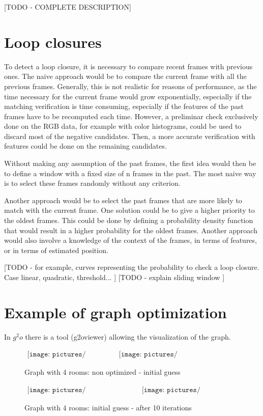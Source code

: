 [TODO - COMPLETE DESCRIPTION]

\section{Loop closures}

To detect a loop closure, it is necessary to compare recent frames with previous ones. The naive approach would be to compare the current frame with all the previous frames. Generally, this is not realistic for reasons of performance, as the time necessary for the current frame would grow exponentially, especially if the matching verification is time consuming, especially if the features of the past frames have to be recomputed each time. However, a preliminar check exclusively done on the RGB data, for example with color histograms, could be used to discard most of the negative candidates. Then, a more accurate verification with features could be done on the remaining candidates.

Without making any assumption of the past frames, the first idea would then be to define a window with a fixed size of n frames in the past. The most naive way is to select these frames randomly without any criterion.

Another approach would be to select the past frames that are more likely to match with the current frame. One solution could be to give a higher priority to the oldest frames. This could be done by defining a probability density function that would result in a higher probability for the oldest frames. Another approach would also involve a knowledge of the context of the frames, in terms of features, or in terms of estimated position.

[TODO - for example, curves representing the probability to check a loop closure. Case linear, quadratic, threshold... ]
[TODO - explain sliding window ]

\section{Example of graph optimization}
In $g^2o$ there is a tool (g2oviewer) allowing the visualization of the graph.

\begin{figure}[h!]
\centering$
\begin{array}{cc}
\texttt{[image: pictures/graph4\_base]} &
\texttt{[image: pictures/graph4\_initial\_guess]}
\end{array}$
\caption{Graph with 4 rooms: non optimized - initial guess}
\end{figure}
\begin{figure}[h!]
\centering$
\begin{array}{cc}
\texttt{[image: pictures/graph4\_initial\_guess]} &
\texttt{[image: pictures/graph4\_optimized]}
\end{array}$
\caption{Graph with 4 rooms: initial guess - after 10 iterations}
\end{figure}

